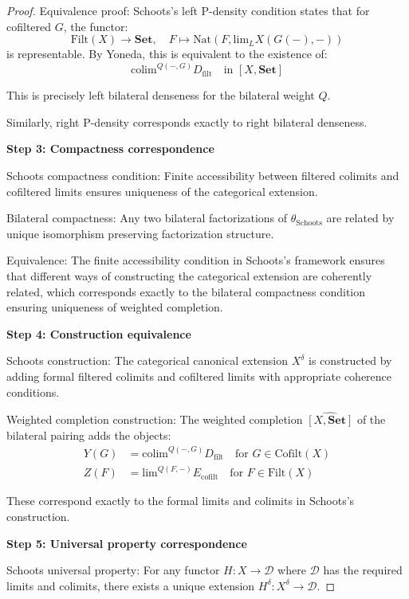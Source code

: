 \documentclass[11pt]{article}
\theoremstyle{plain}
\theoremstyle{definition}
\theoremstyle{remark}
\newcommand{\colim}{\mathrm{colim}}
\renewcommand{\lim}{\mathrm{lim}}
\newcommand{\wh}[1]{\widehat{#1}}
\begin{document}
\begin{proof}
Equivalence proof: 
Schoots's left P-density condition states that for cofiltered $G$, the functor:
$$\text{Filt}(X) \to \mathbf{Set}, \quad F \mapsto \text{Nat}(F, \lim_L X(G(-), -))$$
is representable. By Yoneda, this is equivalent to the existence of:
$$\colim^{Q(-, G)} D_{\text{filt}} \quad \text{in } [X, \mathbf{Set}]$$

This is precisely left bilateral denseness for the bilateral weight $Q$.

Similarly, right P-density corresponds exactly to right bilateral denseness.

\textbf{Step 3: Compactness correspondence}

Schoots compactness condition: Finite accessibility between filtered colimits and cofiltered limits ensures uniqueness of the categorical extension.

Bilateral compactness: Any two bilateral factorizations of $\theta_{\text{Schoots}}$ are related by unique isomorphism preserving factorization structure.

Equivalence: The finite accessibility condition in Schoots's framework ensures that different ways of constructing the categorical extension are coherently related, which corresponds exactly to the bilateral compactness condition ensuring uniqueness of weighted completion.

\textbf{Step 4: Construction equivalence}

Schoots construction: The categorical canonical extension $X^{\delta}$ is constructed by adding formal filtered colimits and cofiltered limits with appropriate coherence conditions.

Weighted completion construction: The weighted completion $\wh{[X, \mathbf{Set}]}$ of the bilateral pairing adds the objects:
\begin{align}
Y(G) &= \colim^{Q(-, G)} D_{\text{filt}} \quad \text{for } G \in \text{Cofilt}(X) \\
Z(F) &= \lim^{Q(F, -)} E_{\text{cofilt}} \quad \text{for } F \in \text{Filt}(X)
\end{align}

These correspond exactly to the formal limits and colimits in Schoots's construction.

\textbf{Step 5: Universal property correspondence}

Schoots universal property: For any functor $H : X \to \mathcal{D}$ where $\mathcal{D}$ has the required limits and colimits, there exists a unique extension $H^{\delta} : X^{\delta} \to \mathcal{D}$.


\end{proof}
\end{document}

